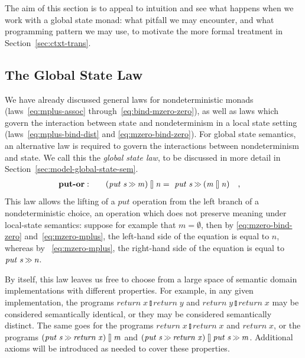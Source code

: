 \documentclass{llncs}
\newcommand{\Varid}[1]{\mathit{#1}}
\let\Varid\mathit
\begin{document}
The aim of this section is to appeal to intuition and see what happens when we work with a global state monad:
what pitfall we may encounter, and what programming pattern we may use,
to motivate the more formal treatment in Section~\ref{sec:ctxt-trans}.

\subsection{The Global State Law}
\label{sec:laws-global-state}

We have already discussed general laws for nondeterministic monads
(laws~\eqref{eq:mplus-assoc} through~\eqref{eq:bind-mzero-zero}),
as well as laws which govern the interaction between state and nondeterminism in
a local state setting (laws~\eqref{eq:mplus-bind-dist} and
\eqref{eq:mzero-bind-zero}).
For global state semantics, an alternative law is required to govern the
interactions between nondeterminism and state.
We call this the \emph{global state law}, to be discussed in more detail in Section~\ref{sec:model-global-state-sem}.
\begin{alignat}{2}
&\mbox{\bf put-or}:\quad&
  \ensuremath{(\Varid{put}\;\Varid{s}\mathbin{\hstretch{0.7}{>\!\!>}}\Varid{m})\mathbin{\talloblong}\Varid{n}} &=~ \ensuremath{\Varid{put}\;\Varid{s}\mathbin{\hstretch{0.7}{>\!\!>}}(\Varid{m}\mathbin{\talloblong}\Varid{n})}~ \mbox{~~,}
    \label{eq:put-or}
\end{alignat}
This law allows the lifting of a \ensuremath{\Varid{put}} operation from the left
branch of a nondeterministic choice, an operation which does not preserve
meaning under local-state semantics:
suppose for example that \ensuremath{\Varid{m}\mathrel{=}\emptyset}, then by
\eqref{eq:mzero-bind-zero} and~\eqref{eq:mzero-mplus}, the left-hand side of
the equation is equal to \ensuremath{\Varid{n}}, whereas by
~\eqref{eq:mzero-mplus},
the right-hand side of the equation is equal to \ensuremath{\Varid{put}\;\Varid{s}\mathbin{\hstretch{0.7}{>\!\!>}}\Varid{n}}.

By itself, this law leaves us free to choose from a large space of semantic domain
implementations with different properties.
For example, in any given implementation, the programs \ensuremath{\Varid{return}\;\Varid{x}\mathbin{\talloblong}\Varid{return}\;\Varid{y}} and
\ensuremath{\Varid{return}\;\Varid{y}\mathbin{\talloblong}\Varid{return}\;\Varid{x}} may be considered semantically identical, or they may be
considered semantically distinct.
The same goes for the programs \ensuremath{\Varid{return}\;\Varid{x}\mathbin{\talloblong}\Varid{return}\;\Varid{x}} and \ensuremath{\Varid{return}\;\Varid{x}},
or the programs \ensuremath{(\Varid{put}\;\Varid{s}\mathbin{\hstretch{0.7}{>\!\!>}}\Varid{return}\;\Varid{x})\mathbin{\talloblong}\Varid{m}} and
\ensuremath{(\Varid{put}\;\Varid{s}\mathbin{\hstretch{0.7}{>\!\!>}}\Varid{return}\;\Varid{x})\mathbin{\talloblong}\Varid{put}\;\Varid{s}\mathbin{\hstretch{0.7}{>\!\!>}}\Varid{m}}.
Additional axioms will be introduced as needed to cover these properties.
\end{document}
